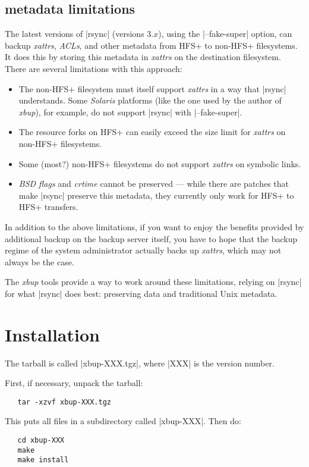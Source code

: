 \documentclass[11pt]{article}
\begin{document}
\subsection{\texttt{} metadata limitations}
\label{rsync-limits}

The latest versions of |rsync| (versions 3.$x$), 
using
the |--fake-super| option, can backup \emph{xattrs},
\emph{ACLs}, and other metadata from HFS+ to non-HFS+ filesystems.
It does this by storing this metadata in \emph{xattrs}
on the destination filesystem.
There are several limitations with this approach:
\begin{itemize}
\item
The non-HFS+ filesystem must itself support
\emph{xattrs} in a way that |rsync| understands.
Some \emph{Solaris} platforms 
(like the one used by the author of \emph{xbup}), for example, do not support
|rsync| with |--fake-super|.

\item
The resource forks on HFS+ can easily 
exceed the size limit for \emph{xattrs} on non-HFS+
filesystems.

\item
Some (most?) non-HFS+ filesystems
do not support \emph{xattrs} on symbolic links.

\item
\emph{BSD flags} and
\emph{crtime} cannot be preserved --- while there
are patches that make |rsync| preserve this
metadata, they currently only work for HFS+ to HFS+ transfers. 
\end{itemize}

In addition to the above limitations,
if you want to enjoy the benefits provided by additional
backup on the backup server itself, you have to
hope that the backup regime of the system administrator
actually backs up \emph{xattrs}, which may not always
be the case.

The \emph{xbup} tools provide a way to work around
these limitations, relying on |rsync| for what |rsync| does best:
preserving data and traditional Unix metadata.






\section{Installation}

The tarball is called |xbup-XXX.tgz|, where |XXX| is the version number.

First, if necessary, unpack the tarball:
\begin{Verbatim}
   tar -xzvf xbup-XXX.tgz
\end{Verbatim}
This puts all files in a subdirectory called |xbup-XXX|.
Then do:
\begin{Verbatim}
   cd xbup-XXX
   make
   make install  
\end{Verbatim}
\end{document}
